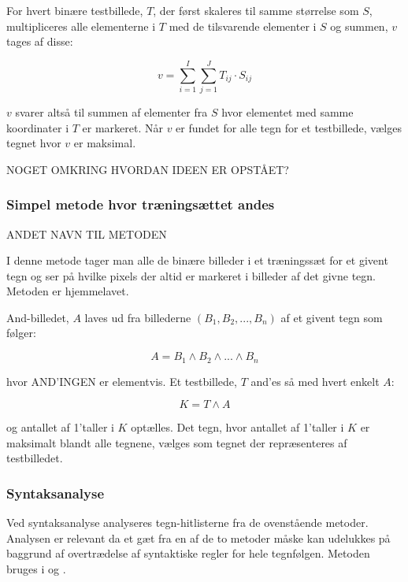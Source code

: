 For hvert binære testbillede, $T$, der først skaleres til samme størrelse som $S$, multipliceres alle elementerne i $T$ med de tilsvarende elementer i $S$ og summen, $v$ tages af disse:

\begin{displaymath}
	v = \sum_{i=1}^I{\sum_{j=1}^J{T_{ij} \cdot S_{ij}}}
\end{displaymath}

$v$ svarer altså til summen af elementer fra $S$ hvor elementet med samme koordinater i $T$ er markeret. Når $v$ er fundet for alle tegn for et testbillede, vælges tegnet hvor $v$ er maksimal.

NOGET OMKRING HVORDAN IDEEN ER OPSTÅET?

\subsubsection{Simpel metode hvor træningsættet andes}

ANDET NAVN TIL METODEN

I denne metode tager man alle de binære billeder i et træningssæt for et givent tegn og ser på hvilke pixels der altid er markeret i billeder af det givne tegn. Metoden er hjemmelavet.

And-billedet, $A$ laves ud fra billederne $(B_{1},B_{2},...,B_{n})$ af et givent tegn som følger:

\begin{displaymath}
A = B_1 \wedge B_2 \wedge ... \wedge B_n
\end{displaymath}

hvor AND'INGEN er elementvis. Et testbillede, $T$ and'es så med hvert enkelt $A$:

\begin{displaymath}
K = T \wedge A
\end{displaymath}

og antallet af 1'taller i $K$ optælles. Det tegn, hvor antallet af 1'taller i $K$ er maksimalt blandt alle tegnene, vælges som tegnet der repræsenteres af testbilledet.

\subsubsection{Syntaksanalyse}

Ved syntaksanalyse analyseres tegn-hitlisterne fra de ovenstående metoder. Analysen er relevant da et gæt fra en af de to metoder måske kan udelukkes på baggrund af overtrædelse af syntaktiske regler for hele tegnfølgen. Metoden bruges i \cite{nijhuis} og \cite{kwas}.

